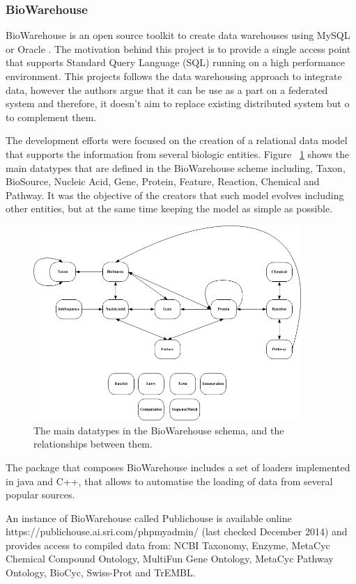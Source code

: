 \subsubsection{BioWarehouse}
BioWarehouse is an open source toolkit to create data warehouses using MySQL or Oracle \cite{LEE2006}. The motivation behind this project is to provide  a single access point that supports Standard Query Language (SQL) running on a high performance environment.
This projects follows the data warehousing approach to integrate data, however the authors argue that it can be use as a part on a federated system and therefore, it doesn't aim to replace existing distributed system but o to complement them.

The development efforts were focused on the creation of a relational data model that supports the information from several biologic entities. Figure ~\ref{fig:biowarehouse} shows the main datatypes that are defined in the BioWarehouse scheme including, Taxon, BioSource, Nucleic Acid, Gene, Protein, Feature, Reaction, Chemical and Pathway. It was the objective of the creators that such model evolves including other entities, but at the same time keeping the model as simple as possible.

\begin{figure}  
\includegraphics[width=4in]{figures/biowarehouse.png}
\caption[Original BioWarehouse schema.]{The main datatypes in the BioWarehouse schema, and the relationships between them.
\label{fig:biowarehouse}}
\end{figure}

The package that composes BioWarehouse includes a set of loaders implemented in java and C++, that allows to automatise the loading of data from several popular sources. 

An instance of BioWarehouse called Publichouse is available online https://publichouse.ai.sri.com/phpmyadmin/ (last checked December 2014) and provides access to compiled data from: NCBI Taxonomy, Enzyme, MetaCyc Chemical Compound Ontology, MultiFun Gene Ontology, MetaCyc Pathway Ontology, BioCyc, Swiss-Prot and TrEMBL.

